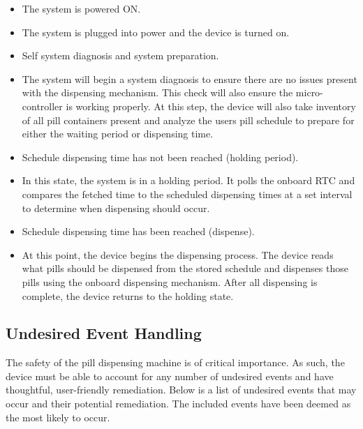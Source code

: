 \documentclass[12pt,titlepage]{article}
\begin{document}
\begin{itemize}[leftmargin=*]
    \item The system is powered ON.
\end{itemize}
\begin{itemize}[label={}]
\item The system is plugged into power and the device is turned on. 
\end{itemize}
\begin{itemize}[leftmargin=*]
    \item Self system diagnosis and system preparation.
\end{itemize}
\begin{itemize}[label={}]
\item The system will begin a system diagnosis to ensure there are no issues present with the dispensing mechanism. This check will also ensure the micro-controller is working properly. At this step, the device will also take inventory of all pill containers present and analyze the users pill schedule to prepare for either the waiting period or dispensing time.
\end{itemize}
\begin{itemize}[leftmargin=*]
    \item Schedule dispensing time has not been reached (holding period).
\end{itemize}
\begin{itemize}[label={}]
\item In this state, the system is in a holding period. It polls the onboard RTC and compares the fetched time to the scheduled dispensing times at a set interval to determine when dispensing should occur.  
\end{itemize}
\begin{itemize}[leftmargin=*]
    \item Schedule dispensing time has been reached (dispense).
\end{itemize}
\begin{itemize}[label={}]
\item At this point, the device begins the dispensing process. The device reads what pills should be dispensed from the stored schedule and dispenses those pills using the onboard dispensing mechanism. After all dispensing is complete, the device returns to the holding state.
\end{itemize}

\subsection{Undesired Event Handling}
The safety of the pill dispensing machine is of critical importance. As such, the device must be able to account for any number of undesired events and have thoughtful, user-friendly remediation. Below is a list of undesired events that may occur and their potential remediation. The included events have been deemed as the most likely to occur.
\end{document}
